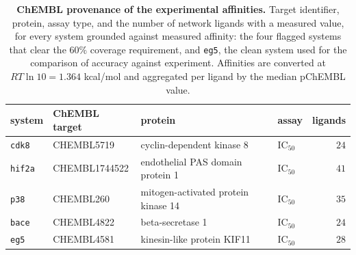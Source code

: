 \begin{table}[t]\centering
\caption{\textbf{ChEMBL provenance of the experimental affinities.} Target identifier, protein,
assay type, and the number of network ligands with a measured value, for every system grounded
against measured affinity: the four flagged systems that clear the $60\%$ coverage requirement,
and \texttt{eg5}, the clean system used for the comparison of accuracy against experiment. Affinities are converted at $RT\ln 10 = 1.364$ kcal/mol and
aggregated per ligand by the median pChEMBL value.}
\label{tab:chembl}
\small
\begin{tabular}{@{}llll r@{}}
\toprule
system & ChEMBL target & protein & assay & ligands \\
\midrule
\texttt{cdk8}  & CHEMBL5719    & cyclin-dependent kinase 8    & $\mathrm{IC}_{50}$ & $24$ \\
\texttt{hif2a} & CHEMBL1744522 & endothelial PAS domain protein 1 & $\mathrm{IC}_{50}$ & $41$ \\
\texttt{p38}   & CHEMBL260     & mitogen-activated protein kinase 14 & $\mathrm{IC}_{50}$ & $35$ \\
\texttt{bace}  & CHEMBL4822    & beta-secretase 1             & $\mathrm{IC}_{50}$ & $24$ \\
\midrule
\texttt{eg5}   & CHEMBL4581    & kinesin-like protein KIF11   & $\mathrm{IC}_{50}$ & $28$ \\
\bottomrule
\end{tabular}

\smallskip
{}
\end{table}
